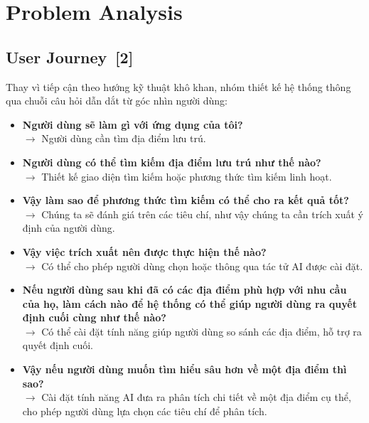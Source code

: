 \documentclass[12pt, a4paper]{article}
\begin{document}
\section{Problem Analysis}

\subsection[User Journey]{User Journey \,{\normalfont\small\textcolor{cyan!70!black}{[2]}}}

Thay vì tiếp cận theo hướng kỹ thuật khô khan, nhóm thiết kế hệ thống thông qua chuỗi câu hỏi dẫn dắt từ góc nhìn người dùng:

\begin{itemize}[label=\textcolor{blue!70!black}{\faQuestionCircle}, leftmargin=0.5cm]
  \item \textbf{Người dùng sẽ làm gì với ứng dụng của tôi?} \\
  $\rightarrow$ Người dùng cần tìm địa điểm lưu trú.
  
  \item \textbf{Người dùng có thể tìm kiếm địa điểm lưu trú như thế nào?} \\
  $\rightarrow$ Thiết kế giao diện tìm kiếm hoặc phương thức tìm kiếm linh hoạt.

  \item \textbf{Vậy làm sao để phương thức tìm kiếm có thể cho ra kết quả tốt?} \\
  $\rightarrow$ Chúng ta sẽ đánh giá trên các tiêu chí, như vậy chúng ta cần trích xuất ý định của người dùng.

  \item \textbf{Vậy việc trích xuất nên được thực hiện thế nào?} \\
  $\rightarrow$ Có thể cho phép người dùng chọn hoặc thông qua tác tử AI được cài đặt.

  \item \textbf{Nếu người dùng sau khi đã có các địa điểm phù hợp với nhu cầu của họ, làm cách nào để hệ thống có thể giúp người dùng ra quyết định cuối cùng như thế nào?} \\
  $\rightarrow$ Có thể cài đặt tính năng giúp người dùng so sánh các địa điểm, hỗ trợ ra quyết định cuối.

  \item \textbf{Vậy nếu người dùng muốn tìm hiểu sâu hơn về một địa điểm thì sao?} \\
  $\rightarrow$ Cài đặt tính năng AI đưa ra phân tích chi tiết về một địa điểm cụ thể, cho phép người dùng lựa chọn các tiêu chí để phân tích.


\end{itemize}
\end{document}
